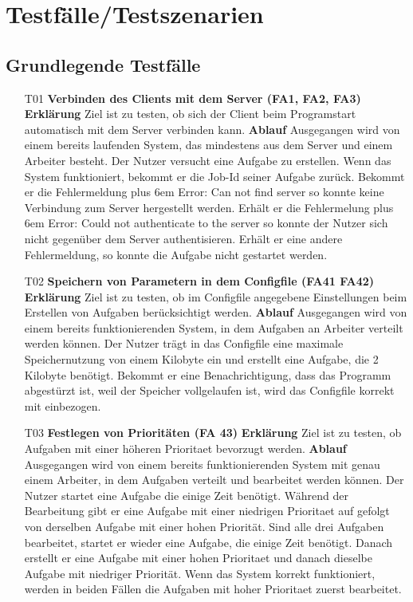 \documentclass[a4paper,12pt]{article}
\makeatletter
\newenvironment{mycode}
 {\def\@xobeysp{\ }\verbatim\rightskip=0pt plus 6em\relax}
 {\endverbatim}
\makeatother
\begin{document}
\clearpage
\section{Testfälle/Testszenarien}
\subsection{Grundlegende Testfälle}

\begin{itemize}
\item[T01] \textbf{Verbinden des Clients mit dem Server (FA1, FA2, FA3)}
\subitem \textbf{Erklärung} Ziel ist zu testen, ob sich der Client beim Programstart automatisch mit dem Server verbinden kann.
\subitem \textbf{Ablauf} Ausgegangen wird von einem bereits laufenden System, das mindestens aus dem Server und einem Arbeiter besteht.
Der Nutzer versucht eine Aufgabe zu erstellen.
Wenn das System funktioniert, bekommt er die Job-Id seiner Aufgabe zurück.
Bekommt er die Fehlermeldung
\begin{mycode}
Error: Can not find server
\end{mycode}
so konnte keine Verbindung zum Server hergestellt werden. Erhält er die Fehlermelung
\begin{mycode}
Error: Could not authenticate to the server
\end{mycode}
so konnte der Nutzer sich nicht gegenüber dem Server authentisieren. Erhält er eine andere Fehlermeldung, so konnte die Aufgabe nicht gestartet werden.

\item[T02] \textbf{Speichern von Parametern in dem \gls{Configfile} (FA41 FA42)}
\subitem \textbf{Erklärung} Ziel ist zu testen, ob im \gls{Configfile} angegebene Einstellungen beim Erstellen von Aufgaben berücksichtigt werden.
\subitem \textbf{Ablauf} Ausgegangen wird von einem bereits funktionierenden System, in dem Aufgaben an Arbeiter verteilt werden können.
Der Nutzer trägt in das \gls{Configfile} eine maximale Speichernutzung von einem Kilobyte ein und erstellt eine Aufgabe, die 2 Kilobyte benötigt.
Bekommt er eine Benachrichtigung, dass das Programm abgestürzt ist, weil der Speicher vollgelaufen ist, wird das \gls{Configfile} korrekt mit einbezogen.

\item[T03] \textbf{Festlegen von Prioritäten (FA 43)}
\subitem \textbf{Erklärung} Ziel ist zu testen, ob Aufgaben mit einer höheren \gls{Prioritaet} bevorzugt werden.
\subitem \textbf{Ablauf} Ausgegangen wird von einem bereits funktionierenden System mit genau einem Arbeiter, in dem Aufgaben verteilt und bearbeitet werden können.
Der Nutzer startet eine Aufgabe die einige Zeit benötigt. Während der Bearbeitung gibt er eine Aufgabe mit einer niedrigen \gls{Prioritaet} auf gefolgt von derselben Aufgabe mit einer hohen Priorität.
Sind alle drei Aufgaben bearbeitet, startet er wieder eine Aufgabe, die einige Zeit benötigt. Danach erstellt er eine Aufgabe mit einer hohen \gls{Prioritaet} und danach dieselbe Aufgabe mit niedriger Priorität.
Wenn das System korrekt funktioniert, werden in beiden Fällen die Aufgaben mit hoher \gls{Prioritaet} zuerst bearbeitet.


\end{itemize}
\end{document}
